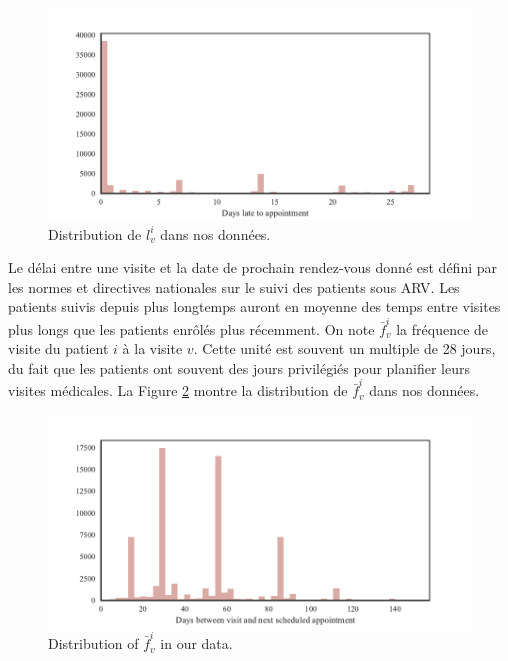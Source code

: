 \documentclass[paper=a4, fontsize=11pt]{scrartcl}
\numberwithin{equation}{section}		%
\numberwithin{figure}{section}			%
\numberwithin{table}{section}				%
\begin{document}
\begin{center}
\begin{figure}[h]
\includegraphics[width=\textwidth]{figure/time_late_to_appointment.pdf}
\caption{Distribution de $l_v^i$ dans nos données.}
\label{fig:late_days}
\end{figure}
\end{center}

Le délai entre une visite et la date de prochain rendez-vous donné est défini par les normes et directives nationales sur le suivi des patients sous ARV. Les patients suivis depuis plus longtemps auront en moyenne des temps entre visites plus longs que les patients enrôlés plus récemment. On note $\bar{f}_v^i$ la fréquence de visite du patient $i$ à la visite $v$. Cette unité est souvent un multiple de 28 jours, du fait que les patients ont souvent des jours privilégiés pour planifier leurs visites médicales. La Figure \ref{fig:schedule_days} montre la distribution de $\bar{f}_v^i$ dans nos données.

\begin{center}
\begin{figure}[h]
\includegraphics[width=\textwidth]{figure/time_to_appointment.pdf}
\caption{Distribution of $\bar{f}_v^i$ in our data.}
\label{fig:schedule_days}
\end{figure}
\end{center}
\end{document}
